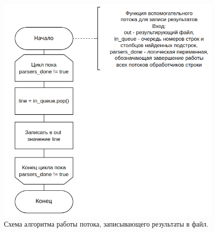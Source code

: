 \begin{figure}[h]
	\centering
	\includegraphics[height=0.6\textheight]{img/thread_writer.png}
	\caption{Схема алгоритма работы потока, записывающего результаты в файл.}
	\label{fig:writer}
\end{figure}

\clearpage

